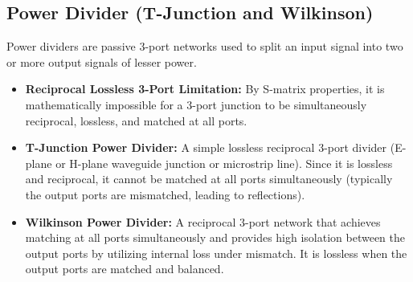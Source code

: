 \documentclass[12pt,a4paper]{article}
\begin{document}
\subsection{Power Divider (T-Junction and Wilkinson)}
Power dividers are passive 3-port networks used to split an input signal into two or more output signals of lesser power.
\begin{itemize}[leftmargin=*, itemsep=3pt]
  \item \textbf{Reciprocal Lossless 3-Port Limitation:} By S-matrix properties, it is mathematically impossible for a 3-port junction to be simultaneously reciprocal, lossless, and matched at all ports.
  \item \textbf{T-Junction Power Divider:} A simple lossless reciprocal 3-port divider (E-plane or H-plane waveguide junction or microstrip line). Since it is lossless and reciprocal, it cannot be matched at all ports simultaneously (typically the output ports are mismatched, leading to reflections).
  \item \textbf{Wilkinson Power Divider:} A reciprocal 3-port network that achieves matching at all ports simultaneously and provides high isolation between the output ports by utilizing internal loss under mismatch. It is lossless when the output ports are matched and balanced.
\end{itemize}

\begin{tcolorbox}[tikzbox, title={Wilkinson Power Divider Transmission Line Layout}]
\centering
{}
\end{tcolorbox}
\end{document}

